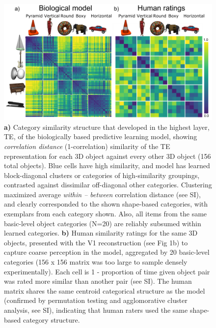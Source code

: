 \documentclass[11pt,twoside]{article}
\newif\myifpdf
\begin{document}
\begin{figure}
  \centering\includegraphics[width=5in]{fig_04} %
  \caption{{\bf a)} Category similarity structure that developed in the highest layer, TE, of the biologically based predictive learning model, showing \emph{correlation distance} (1-correlation) similarity of the TE representation for each 3D object against every other 3D object (156 total objects).  Blue cells have high similarity, and model has learned block-diagonal clusters or categories of high-similarity groupings, contrasted against dissimilar off-diagonal other categories.  Clustering maximized average \emph{within -- between} correlation distance (see SI), and clearly corresponded to the shown shape-based categories, with exemplars from each category shown.  Also, all items from the same basic-level object categories (N=20) are reliably subsumed within learned categories. {\bf b)} Human similarity ratings for the same 3D objects, presented with the V1 reconstruction (see Fig 1b) to capture coarse perception in the model, aggregated by 20 basic-level categories (156 x 156 matrix was too large to sample densely experimentally).  Each cell is 1 - proportion of time given object pair was rated more similar than another pair (see SI).  The human matrix shares the same centroid categorical structure as the model (confirmed by permutation testing and agglomorative cluster analysis, see SI), indicating that human raters used the same shape-based category structure.}
  \label{fig.rsa}
\end{figure}
\end{document}
